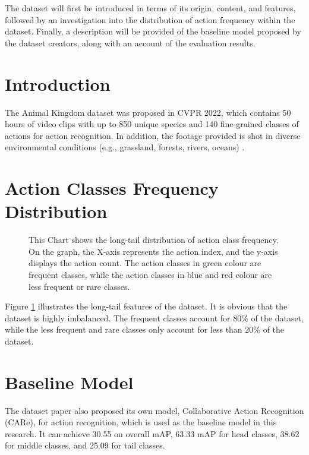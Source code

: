 The dataset will first be introduced in terms of its origin, content, and features, followed by an investigation into the distribution of action frequency within the dataset. Finally, a description will be provided of the baseline model proposed by the dataset creators, along with an account of the evaluation results.

\section{Introduction}
The Animal Kingdom dataset was proposed in CVPR 2022, which contains 50 hours of video clips with up to 850 unique species and 140 fine-grained classes of actions for action recognition. In addition, the footage provided is shot in diverse environmental conditions (e.g., grassland, forests, rivers, oceans) \parencite{ng2022animal}.

\section{Action Classes Frequency Distribution}

\begin{figure}[ht]
    \centering
    \resizebox{1.0\textwidth}{!}{}
    \caption[Action Classes Frequency Distribution]{This Chart shows the long-tail distribution of action class frequency. On the graph, the X-axis represents the action index, and the y-axis displays the action count. The action classes in green colour are frequent classes, while the action classes in blue and red colour are less frequent or rare classes.}
    \label{fig:classfreqdist}
\end{figure}

Figure \ref{fig:classfreqdist} illustrates the long-tail features of the dataset. It is obvious that the dataset is highly imbalanced. The frequent classes account for 80\% of the dataset, while the less frequent and rare classes only account for less than 20\% of the dataset.

\section{Baseline Model}
The dataset paper also proposed its own model, Collaborative Action Recognition (CARe), for action recognition, which is used as the baseline model in this research. It can achieve 30.55 on overall mAP, 63.33 mAP for head classes, 38.62 for middle classes, and 25.09 for tail classes. 
   